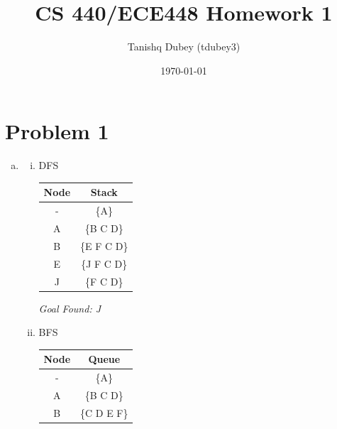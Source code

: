 \documentclass[12pt]{article}%
\begin{document}
\title{CS 440/ECE448 Homework 1}
\author{Tanishq Dubey (tdubey3)}
\date{\today}
\maketitle
\section*{Problem 1}
\begin{enumerate}[(a)]
  \item
  \begin{enumerate}[i.]
  \item
        DFS
        \newline
        \begin{center}
        \hfill\begin{tabular}{c | c} %
            \hline\hline %
            Node & Stack \\ [0.5ex] %
            \hline %
            - & \{A\}  \\ %
            A & \{B C D\}  \\
            B & \{E F C D\}  \\
            E & \{J F C D\}  \\ 
            J & \{F C D\}  \\ [1ex] %
            \hline %
        \end{tabular}\hfill\null
        \end{center}
        \begin{center}
            \textit{Goal Found: J}
        \end{center}
    \item
        BFS
        \newline
        \begin{center}
        \hfill\begin{tabular}{c | c} %
            \hline\hline %
            Node & Queue \\ [0.5ex] %
            \hline %
            - & \{A\}  \\ %
            A & \{B C D\}  \\
            B & \{C D E F\}  \\

\end{tabular}
\end{center}
\end{enumerate}
\end{enumerate}
\end{document}
